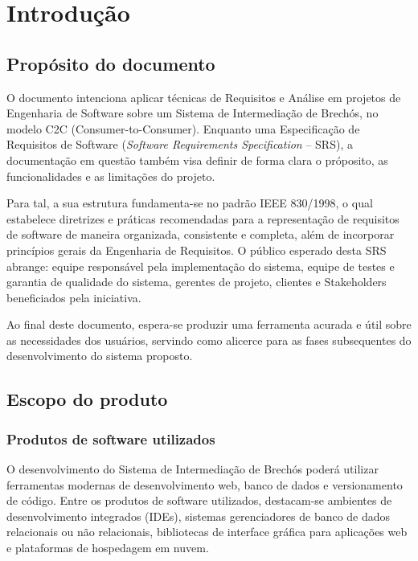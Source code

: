 \documentclass[
	article,			%
	11pt,				%
	oneside,			%
	a4paper,			%
	english,			%
	brazil,				%
	sumario=tradicional
	]{abntex2}
\begin{document}
\textual

\clearpage
\setcounter{page}{1}

\section{Introdução}
\label{sec:Introducao}

\subsection{Propósito do documento}
\label{sec:Proposito}

O documento intenciona aplicar técnicas de Requisitos e Análise em projetos de Engenharia de Software sobre um Sistema de Intermediação de Brechós, no modelo C2C (Consumer-to-Consumer). Enquanto uma Especificação de Requisitos de Software (\textit{Software Requirements Specification} – SRS), a documentação em questão também visa definir de forma clara o próposito, as funcionalidades e as limitações do projeto.

Para tal, a sua estrutura fundamenta-se no padrão IEEE 830/1998, o qual estabelece diretrizes e práticas recomendadas para a representação de requisitos de software de maneira organizada, consistente e completa, além de incorporar princípios gerais da Engenharia de Requisitos. O público esperado desta SRS abrange: equipe responsável pela implementação do sistema, equipe de testes e garantia de qualidade do sistema, gerentes de projeto, clientes e Stakeholders beneficiados pela iniciativa.

Ao final deste documento, espera-se produzir uma ferramenta acurada e útil sobre as necessidades dos usuários, servindo como alicerce para as fases subsequentes do desenvolvimento do sistema proposto.

\subsection{Escopo do produto}
\label{sec:Escopo}

\subsubsection{Produtos de software utilizados}
\label{sec:Produtos}

O desenvolvimento do Sistema de Intermediação de Brechós poderá utilizar ferramentas modernas de desenvolvimento web, banco de dados e versionamento de código. Entre os produtos de software utilizados, destacam-se ambientes de desenvolvimento integrados (IDEs), sistemas gerenciadores de banco de dados relacionais ou não relacionais, bibliotecas de interface gráfica para aplicações web e plataformas de hospedagem em nuvem.
\end{document}
